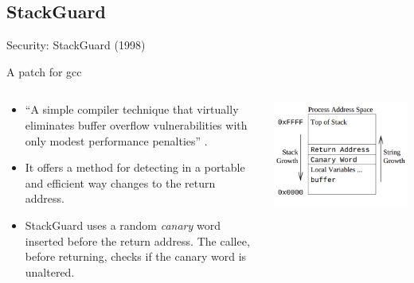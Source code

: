\subsection{StackGuard}
\begin{frame}{Security: StackGuard (1998)}
	\begin{block}{A patch for gcc}
		\begin{columns}
			\begin{column}{.6\textwidth}
				\begin{itemize}
					\item ``A simple compiler technique that virtually eliminates buffer
						overflow vulnerabilities with only modest performance penalties''
						\cite{stackguard}.
					\item It offers a method for detecting in a portable and efficient way
						changes to the return address.
					\item StackGuard uses a random \emph{canary} word inserted before
						the return address. The callee, before returning, checks if the canary
						word is unaltered.
				\end{itemize}
			\end{column}
			\begin{column}{.4\textwidth}
				\includegraphics[width=\textwidth]{imgs/sec-canary.png}
			\end{column}
		\end{columns}
	\end{block}
\end{frame}

